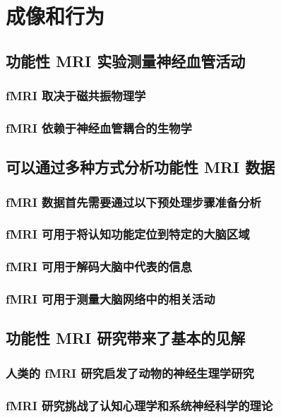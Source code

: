 \chapter{成像和行为}

\section{功能性 MRI 实验测量神经血管活动}

\subsection{fMRI 取决于磁共振物理学}
\subsection{fMRI 依赖于神经血管耦合的生物学}

\section{可以通过多种方式分析功能性 MRI 数据}
\subsection{fMRI 数据首先需要通过以下预处理步骤准备分析}
\subsection{fMRI 可用于将认知功能定位到特定的大脑区域}
\subsection{fMRI 可用于解码大脑中代表的信息}
\subsection{fMRI 可用于测量大脑网络中的相关活动}

\section{功能性 MRI 研究带来了基本的见解}
\subsection{人类的 fMRI 研究启发了动物的神经生理学研究}
\subsection{fMRI 研究挑战了认知心理学和系统神经科学的理论}
